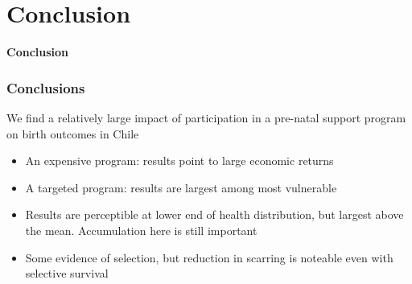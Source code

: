 \documentclass[10pt,letterpaper,subeqn,table]{beamer}
\begin{document}



\section{Conclusion}
\begin{frame}
\begin{center}
  \textbf{Conclusion}
\end{center}
\end{frame}


\begin{frame}
\frametitle{Conclusions}
We find a relatively large impact of participation in a pre-natal support program on birth outcomes in Chile \\ \vspace{3mm}
\begin{itemize}
\item An expensive program: results point to large economic returns
\item A targeted program: results are largest among most vulnerable
\item Results are perceptible at lower end of health distribution, but largest above the mean.  Accumulation here is still important \citep{Royer2009}
\item Some evidence of selection, but reduction in scarring is noteable even with selective survival
\end{itemize}
\end{frame}
\end{document}
